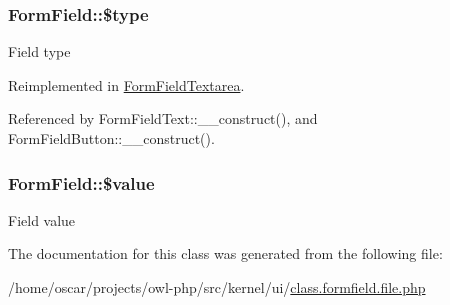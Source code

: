 \subsubsection[{\$type}]{\setlength{\rightskip}{0pt plus 5cm}FormField::\$type}\label{classFormField_a37bed21a1891e95be0e4a697e45ba51b}
Field type 

Reimplemented in \hyperlink{classFormFieldTextarea_a85348034822c70694fc8640bfcacc04d}{FormFieldTextarea}.



Referenced by FormFieldText::\_\-\_\-construct(), and FormFieldButton::\_\-\_\-construct().

\subsubsection[{\$value}]{\setlength{\rightskip}{0pt plus 5cm}FormField::\$value}\label{classFormField_a3c01e89834248eec8e2f145fbcfa0fbc}
Field value 

The documentation for this class was generated from the following file:\begin{DoxyCompactItemize}
\item 
/home/oscar/projects/owl-\/php/src/kernel/ui/\hyperlink{class_8formfield_8file_8php}{class.formfield.file.php}\end{DoxyCompactItemize}
